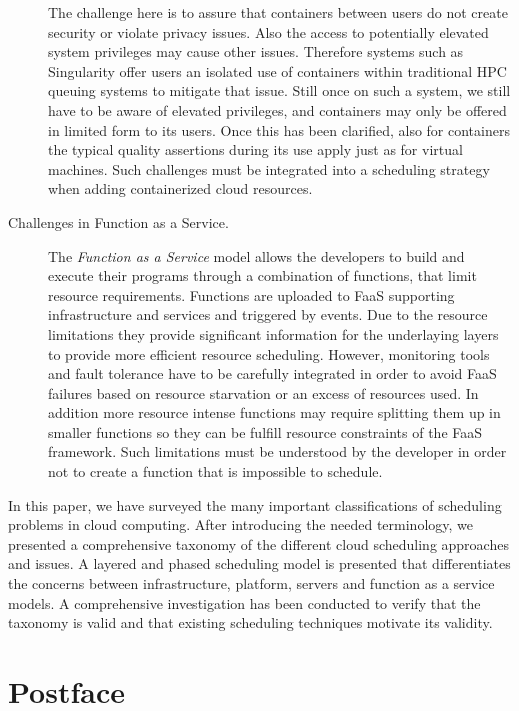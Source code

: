 \documentclass[final,5p,times,twocolumn]{elsarticle}
\begin{document}
\begin{description}
The challenge here is to assure that containers between users do not
create security or violate privacy issues. Also the access to
potentially elevated system privileges may cause other issues.
Therefore systems such as Singularity offer users an isolated use of
containers within traditional HPC queuing systems to mitigate that
issue. Still once on such a system, we still have to be aware of
elevated privileges, and containers may only be offered in limited
form to its users. Once this has been clarified, also for containers
the typical quality assertions during its use apply just as for
virtual machines. Such challenges must be integrated into a scheduling
strategy when adding containerized cloud resources.


\item[Challenges in Function as a Service.] The {\em Function as a
    Service} model allows the developers to build and execute their
  programs through a combination of functions, that limit resource
  requirements. Functions are uploaded to FaaS supporting
  infrastructure and services and triggered by events. Due to the
  resource limitations they provide significant information for the
  underlaying layers to provide more efficient resource scheduling.
  However, monitoring tools and fault tolerance have to be carefully
  integrated in order to avoid FaaS failures based on resource
  starvation or an excess of resources used. In addition more resource
  intense functions may require splitting them up in smaller functions
  so they can be fulfill resource constraints of the FaaS framework.
  Such limitations must be understood by the developer in order not to
  create a function that is impossible to schedule.

\end{description}

\color{black}

In this paper, we have surveyed the many important classifications of
scheduling problems in cloud computing. After introducing the needed
terminology, we presented a comprehensive taxonomy of the different
cloud scheduling approaches and issues. A layered and phased
scheduling model is presented that differentiates the concerns between
infrastructure, platform, servers and function as a service models. A
comprehensive investigation has been conducted to verify that the
taxonomy is valid and that existing scheduling techniques motivate its
validity.



\section*{Postface}
\end{document}
